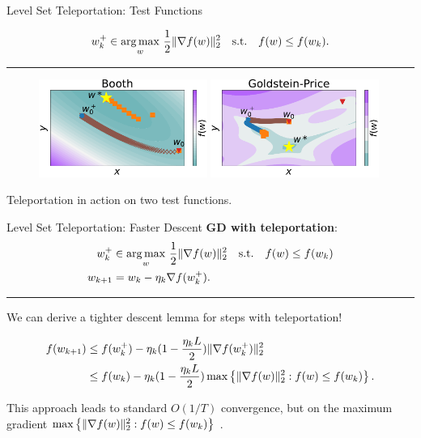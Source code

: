 \documentclass[usenames,dvipsnames,mathserif,notheorems]{beamer}
\newcommand{\horizontalrule}{
	{
			\vspace{-0.5em}
			\center \rule{\textwidth}{0.1em}
			\vspace{-0.2em}
		}
}
\newcommand{\good}[1]{\textcolor{good}{#1}}
\begin{document}
\begin{frame}{Level Set Teleportation: Test Functions}

    \[
        w_k^+ \in \mathop{\rm arg\,max}_w \, \frac 1 2 \|\nabla f(w)\|^2_2  \quad \text{s.t.} \quad f(w) \leq f(w_k).
    \]

    \horizontalrule
    \pause

    \begin{figure}[]
        \centering
        \includegraphics[width=0.49\textwidth]{assets/Booth-2d.pdf}
        \includegraphics[width=0.49\textwidth]{assets/Goldstein-Price-2d.pdf}
    \end{figure}

    \begin{center}
        \Large Teleportation in action on two test functions.
    \end{center}
\end{frame}

\begin{frame}{Level Set Teleportation: Faster Descent}
    \textbf{GD with teleportation}:
    \[
        \begin{aligned}
            w_k^+ & \in \mathop{\rm arg\,max}_w \, \frac 1 2 \|\nabla f(w)\|^2_2  \quad \text{s.t.} \quad f(w) \leq f(w_k) \\
            w_{k+1}  & = w_k - \eta_k \nabla f(w_k^+).
        \end{aligned}
    \]

    \pause
    \horizontalrule

    We can derive a \good{tighter descent lemma} for steps with teleportation!
    \pause
    \vspace{-1ex}

    \begin{align*}
        f(w_{k+1})
         & \leq f(w_k^+) - \eta_k (1 - \frac{\eta_k L}{2}) \|\nabla f(w_k^+)\|_2^2                          \\
         & \leq f(w_k) - \eta_k (1 - \frac{\eta_k L}{2}) \max \left\{\|\nabla f(w)\|_2^2 : f(w) \leq f(w_k)\right\}.
    \end{align*}
    \pause
    \vspace{-1ex}

    This approach leads to standard \( O(1/T) \) convergence, but on
    the \good{maximum} gradient \( \max \left\{\|\nabla f(w)\|_2^2 : f(w) \leq f(w_k)\right\} \)
    \citep{zhao2023symmetry}.

\end{frame}
\end{document}
